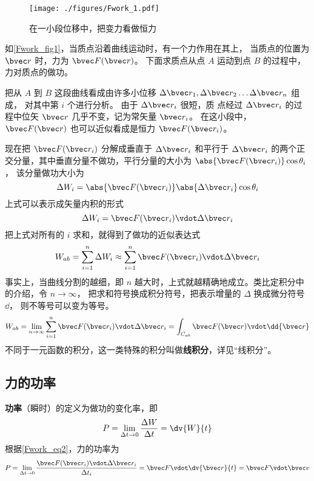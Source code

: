 

\begin{figure}[ht]
\centering
\texttt{[image: ./figures/Fwork\_1.pdf]}
\caption{在一小段位移中，把变力看做恒力}\label{Fwork_fig1}
\end{figure}

如\autoref{Fwork_fig1}，当质点沿着曲线运动时，有一个力作用在其上， 当质点的位置为 $\bvec r$ 时，力为 $\bvec F(\bvec r)$。 下面求质点从点 $A$ 运动到点 $B$ 的过程中，力对质点的做功。

把从 $A$ 到 $B$ 这段曲线看成由许多小位移 $\Delta \bvec r_1, \Delta \bvec r_2 \dots \Delta \bvec r_n$ 组成， 对其中第 $i$ 个进行分析。 由于 $\Delta \bvec r_i$ 很短，质
点经过 $\Delta \bvec r_i$ 的过程中位矢 $\bvec r$ 几乎不变，记为常矢量 $\bvec r_i$。 在这小段中，  $\bvec F(\bvec r)$ 也可以近似看成是恒力 $\bvec F(\bvec r_i)$。 

现在把 $\bvec F(\bvec r_i)$ 分解成垂直于 $\Delta \bvec r_i$ 和平行于 $\Delta \bvec r_i$ 的两个正交分量，其中垂直分量不做功，平行分量的大小为 $ \abs{\bvec F(\bvec r_i)} \cos \theta_i$， 该分量做功大小为
\begin{equation}
\Delta W_i = \abs{\bvec F(\bvec r_i)} \abs{\Delta \bvec r_i} \cos \theta_i
\end{equation}
上式可以表示成矢量内积的形式
\begin{equation}\label{Fwork_eq2}
\Delta W_i = \bvec F(\bvec r_i) \vdot \Delta \bvec r_i
\end{equation}
把上式对所有的 $i$ 求和，就得到了做功的近似表达式
\begin{equation}
W_{ab} = \sum_{i = 1}^n \Delta W_i  \approx \sum_{i = 1}^n \bvec F(\bvec r_i) \vdot \Delta \bvec r_i 
\end{equation} 
事实上，当曲线分割的越细，即 $n$ 越大时，上式就越精确地成立。类比定积分中的介绍，令 $n \to \infty $， 把求和符号换成积分符号，把表示增量的 $\Delta $ 换成微分符号 $\dd{}$， 则不等号可以变为等号。
\begin{equation}\label{Fwork_eq1}
W_{ab} = \lim_{n \to \infty } \sum_{i = 1}^n \bvec F(\bvec r_i) \vdot \Delta \bvec r_i  = \int_{C_{ab}} \bvec F(\bvec r) \vdot \dd{\bvec r}
\end{equation} 
不同于一元函数的积分，这一类特殊的积分叫做\textbf{线积分}，详见“线积分”。

\subsection{力的功率}
\textbf{功率}（瞬时）的定义为做功的变化率，即
\begin{equation}
P = \lim_{\Delta t\to 0} \frac{\Delta W}{\Delta t} = \dv{W}{t}
\end{equation}
根据\autoref{Fwork_eq2}，力的功率为
\begin{equation}
P = \lim_{\Delta t\to 0} \frac{\bvec F(\bvec r_i)\vdot\Delta\bvec r_i}{\Delta t_i} = \bvec F \vdot\dv{\bvec r}{t} = \bvec F\vdot\bvec v
\end{equation}






